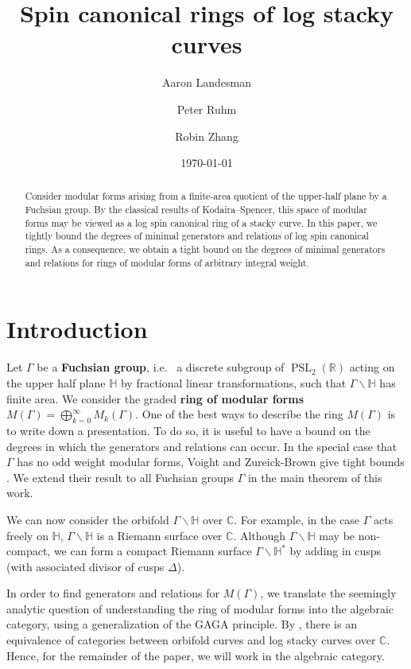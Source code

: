 \documentclass{amsart}
\title{Spin canonical rings of log stacky curves}
\author{Aaron Landesman}
\author{Peter Ruhm}
\author{Robin Zhang}
\date{\today}
\theoremstyle{plain}
\theoremstyle{definition}
\theoremstyle{remark}
\numberwithin{equation}{section}
\newcommand\BH{{\mathbb H}}
\newcommand\BC{{\mathbb C}}
\newcommand\BR{{\mathbb R}}
\newcommand{\PSL}{\operatorname{PSL}}
\begin{document}
\begin{abstract}
 	Consider modular forms arising from a finite-area quotient of the
	upper-half plane by a Fuchsian group. By the classical results of
	Kodaira--Spencer, this space of modular forms may be viewed as a
	log spin canonical ring of a stacky curve. In this paper, we
	tightly bound the degrees of minimal generators and relations of
	log spin canonical rings. As a consequence, we obtain a tight bound
	on the degrees of minimal generators and relations for rings of
	modular forms of arbitrary integral weight.
\end{abstract}

\maketitle


\section{Introduction}
Let $\Gamma$ be a {\bf Fuchsian group}, i.e.~ a discrete subgroup of
$\PSL_2(\BR)$ acting on the upper half plane $\BH$ by fractional
linear transformations, such that $\Gamma \backslash \BH$ has finite area.
We consider the graded {\bf ring of modular forms}
$M(\Gamma) = \bigoplus_{k = 0}^\infty M_k(\Gamma)$. One of the best ways to describe the ring $M(\Gamma)$ is to write down a presentation.
To do so, it is useful to have a bound on the
degrees in which the generators and relations can occur. In the
special case that $\Gamma$ has no odd weight modular forms, Voight
and Zureick-Brown give tight bounds \cite[Chapters 7-9]{vzb:stacky}.
We extend their result to all Fuchsian groups $\Gamma$ in the main
theorem of this work.

We can now consider the orbifold $\Gamma \backslash \BH$ over $\BC$.
For example, in the case $\Gamma$ acts freely on $\BH$, $\Gamma
\backslash \BH$ is a Riemann surface over $\BC$. 
Although $\Gamma \backslash \BH$ may be non-compact, we can form a
compact Riemann surface $\Gamma \backslash \BH^*$ by adding in
cusps (with associated divisor of cusps $\Delta$).

In order to find generators and relations for $M(\Gamma)$, we
translate the seemingly analytic question of understanding the ring
of modular forms into the algebraic category, using a
generalization of the GAGA principle.
By \cite[Proposition 6.1.5]
{vzb:stacky}, there is an equivalence of categories between orbifold
curves and log stacky curves over $\BC$. Hence, for the remainder
of the paper, we will work in the algebraic category.
\end{document}
